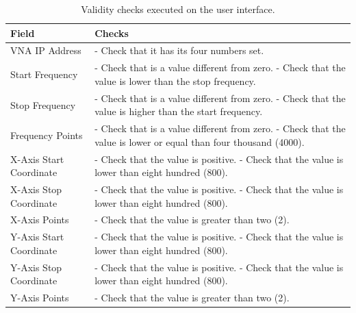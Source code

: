 \documentclass{article}
\begin{document}
\begin{singlespace}
    \begin{xltabular}{\textwidth}{|l|X|}
    
        \hline \textbf{Field} & \textbf{Checks} \\ \hline
        \endhead
        
        \caption{Validity checks executed on the user interface.} \label{tab:gui_checks}
        \endlastfoot

        VNA IP Address & - Check that it has its four numbers set. \\ \hline
        Start Frequency & - Check that is a value different from zero. \newline - Check that the value is lower than the stop frequency. \\ \hline
        Stop Frequency & - Check that is a value different from zero. \newline - Check that the value is higher than the start frequency. \\ \hline
        Frequency Points & - Check that is a value different from zero. \newline - Check that the value is lower or equal than four thousand (4000). \\ \hline
        X-Axis Start Coordinate & - Check that the value is positive. \newline - Check that the value is lower than eight hundred (800). \\ \hline
        X-Axis Stop Coordinate & - Check that the value is positive. \newline - Check that the value is lower than eight hundred (800). \\ \hline
        X-Axis Points & - Check that the value is greater than two (2). \\ \hline
        Y-Axis Start Coordinate & - Check that the value is positive. \newline - Check that the value is lower than eight hundred (800). \\ \hline
        Y-Axis Stop Coordinate & - Check that the value is positive. \newline - Check that the value is lower than eight hundred (800). \\ \hline
        Y-Axis Points & - Check that the value is greater than two (2). \\ \hline
    \end{xltabular}
\end{singlespace}
\end{document}
